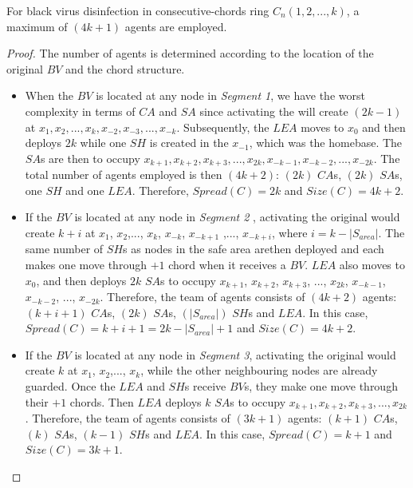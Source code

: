 
 
\begin{theorem}\label{theo:agents_cc}
For black virus disinfection in consecutive-chords ring $C_n(1,2,...,k)$, a maximum of $(4k+1)$ agents are employed.

\end{theorem}
\begin{proof}
The number of agents is determined according to the location of the original $BV$ and the chord structure.
\begin{itemize} 
\item
When the $BV$ is located at any node in  {\em Segment 1}, 
we have  the worst complexity in terms of $CA$ and $SA$ since activating the \bv will create $(2k-1)$ \bvs at $x_{1},x_{2},...,x_{k},x_{-2},x_{-3},...,x_{-k}$. Subsequently, the $LEA$ moves to $x_{0}$ and then deploys $2k$ while one $SH$ is created in the $x_{-1}$, which was the homebase.
The $SA$s are then to occupy $x_{k+1},x_{k+2},x_{k+3},...,x_{2k},x_{-k-1},x_{-k-2},...,x_{-2k}$. The total number of agents employed is then $(4k+2)$:  $(2k)$ $CA$s, $(2k)$  $SA$s, one $SH$ and one $LEA$. Therefore, $Spread(C)=2k$ and $Size(C)=4k+2$.   
 
\item If the $BV$ is located at any node in {\em  Segment 2 },
activating the original \bv would create $k+i$  \bvs at $x_{1}$, $x_{2}$,..., $x_{k}$, $x_{-k}$, $x_{-k+1}$ ,..., $x_{-k+i}$, where $i=k-|S_{area}|$. The same number of $SH$s as nodes in the safe area arethen deployed and each makes one move through $+1$ chord when it receives a $BV$. $LEA$ also moves to $x_{0}$, and then  deploys $2k$  $SA$s to occupy $x_{k+1}$, $x_{k+2}$, $x_{k+3}$, ..., $x_{2k}$, $x_{-k-1}$, $x_{-k-2}$, ..., $x_{-2k}$.
Therefore, the team of agents consists  of $(4k+2)$ agents: $(k+i+1)$ $CA$s, $(2k)$  $SA$s, $(|S_{area}|)$ $SH$s and $LEA$. In this case,  $Spread(C)=k+i+1=2k-|S_{area}|+1$ and $Size(C)=4k+2$.


\item If the $BV$ is located at any node in {\em Segment 3},
activating the original \bv would create $k$  \bvs at $x_{1}$, $x_{2}$,..., $x_{k}$,  while the other neighbouring nodes are already guarded. Once the $LEA$ and $SH$s receive $BV$s, they make one move through their $+1$ chords. Then $LEA$  deploys $k$  $SA$s to occupy $x_{k+1},x_{k+2},x_{k+3},...,x_{2k}$.
Therefore, the team of agents consists  of $(3k+1)$ agents: $(k+1)$ $CA$s, $(k)$  $SA$s, $(k-1)$ $SH$s and $LEA$. In this case,  $Spread(C)=k+1$ and $Size(C)=3k+1$.
 

\end{itemize}
\end{proof}
